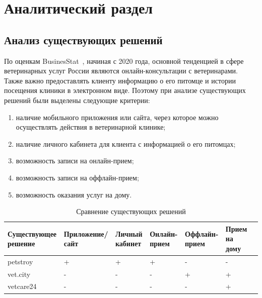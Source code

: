 \section{Аналитический раздел}

\subsection{Анализ существующих решений}

По оценкам BusinesStat~\cite{businesstat}, начиная с 2020 года, основной тенденцией в сфере ветеринарных услуг России являются онлайн-консультации с ветеринарами. Также важно предоставлять клиенту информацию о его питомце и истории посещения клиники в электронном виде. Поэтому при анализе существующих решений были выделены следующие критерии:
\begin{enumerate}[label*=---]
	\item наличие мобильного приложения или сайта, через которое можно осуществлять действия в ветеринарной клинике;
 	\item наличие личного кабинета для клиента с информацией о его питомцах;
 	\item возможность записи на онлайн-прием;
 	\item возможность записи на оффлайн-прием;
 	\item возможность оказания услуг на дому.
 \end{enumerate}

\begin{table}[hbtp]
	\begin{center}
		\begin{flushleft}
			\captionsetup{justification=raggedright, singlelinecheck=false}
			\caption{\label{tab:solve}Сравнение существующих решений}
		\end{flushleft}
		\begin{tabular}{|  p{} | p{} | p{}  |  p{} | p{} | p{} | p{} |} 
			\hline  Существующее решение &Приложение/ сайт & Личный кабинет  & Онлайн- прием & Оффлайн- прием & Прием на дому\\ \hline
			
			petstroy~\cite{petstory} &   + &   + & + & - & - \\ \hline
			vet.city~\cite{vetcity} &   - &   - & - & + &   + \\ \hline
			vetcare24~\cite{vetcare24} &  - &   - & - & - & + \\ \hline
		\end{tabular}
	\end{center}
\end{table}

